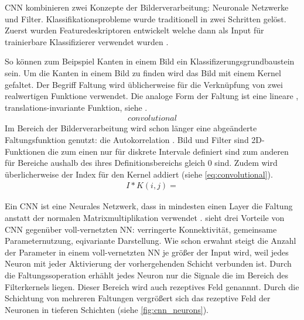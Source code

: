 CNN kombinieren zwei Konzepte der Bilderverarbeitung: Neuronale Netzwerke und Filter.
Klassifikationsprobleme wurde traditionell in zwei Schritten gelöst. Zuerst wurden 
Featuredeskriptoren entwickelt welche dann als Input für trainierbare Klassifizierer 
verwendet wurden \autocite[2353]{RawatDeepConvolutionalNeural2017}.


So können zum Beipspiel Kanten in einem Bild ein Klassifizerungsgrundbaustein sein. 
Um die Kanten in einem Bild zu finden wird das Bild mit einem Kernel  gefaltet.  
Der Begriff Faltung wird üblicherweise für die Verknüpfung von zwei realwertigen Funktione verwendet. Die analoge Form der Faltung ist eine lineare , translations-invariante Funktion, siehe \cite[28]{SusseBildverarbeitungundObjekterkennung2014}. 
\begin{align}
    \label{eq:convolutional}
    convolutional
\end{align}
Im Bereich der Bilderverarbeitung wird schon länger eine abgeänderte Faltungsfunktion genutzt: die Autokorrelation . Bild und Filter sind 2D-Funktionen die zum einen nur für diskrete Intervale definiert sind zum anderen für Bereiche aushalb des ihres Definitionsbereichs gleich 0 sind. Zudem wird überlicherweise der Index für den Kernel addiert (siehe \cref{eq:convolutional}).
\begin{align}
    \label{eq:crosscorrelation}
    I*K(i,j) =
\end{align}


Ein CNN ist eine Neurales Netzwerk, dass in mindesten einen Layer die Faltung anstatt der normalen Matrixmultiplikation verwendet \parencite[321]{GoodfellowDeeplearning2016}.
\cite{GoodfellowDeeplearning2016} sieht drei Vorteile von CNN gegenüber voll-vernetzten NN: verringerte Konnektivität, 
gemeinsame Parameternutzung, eqivariante Darstellung.
Wie schon erwahnt steigt die Anzahl der Parameter in einem voll-vernetzten NN je größer der Input wird, weil jedes Neuron mit jeder Aktivierung der vorhergehenden Schicht verbunden ist. 
Durch die Faltungssoperation erhählt jedes Neuron nur die Signale die im Bereich des Filterkernels liegen. Dieser Bereich wird auch rezeptives Feld genannnt.
Durch die Schichtung von mehreren Faltungen vergrößert sich das rezeptive Feld der Neuronen in tieferen Schichten (siehe \cref{fig:cnn_neurons}).


